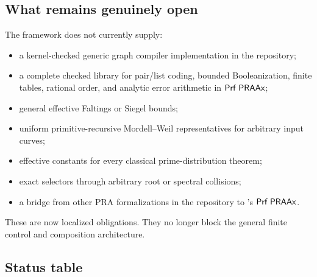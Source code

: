 \subsection{What remains genuinely open}

The framework does not currently supply:

\begin{itemize}
\item a kernel-checked generic graph compiler implementation in the repository;
\item a complete checked library for pair/list coding, bounded Booleanization,
finite tables, rational order, and analytic error arithmetic in
\(\mathsf{Prf}\;\mathsf{PRAAx}\);
\item general effective Faltings or Siegel bounds;
\item uniform primitive-recursive Mordell--Weil representatives for arbitrary
input curves;
\item effective constants for every classical prime-distribution theorem;
\item exact selectors through arbitrary root or spectral collisions;
\item a bridge from other PRA formalizations in the repository to
's \(\mathsf{Prf}\;\mathsf{PRAAx}\).
\end{itemize}

These are now localized obligations.  They no longer block the general finite
control and composition architecture.

\subsection{Status table}

